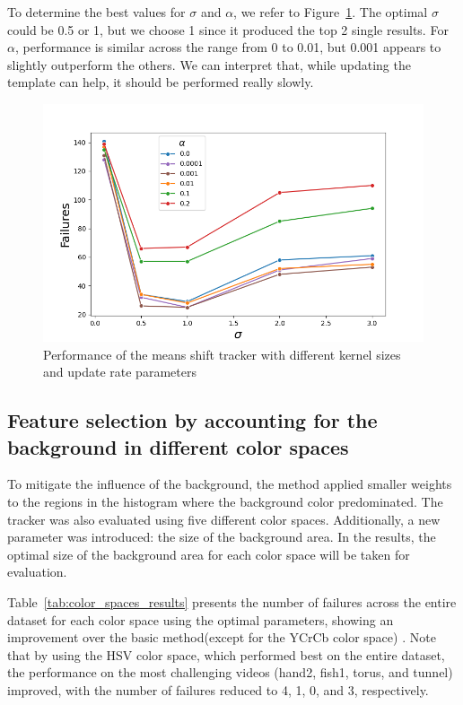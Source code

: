 \documentclass[9pt]{IEEEtran}
\begin{document}
To determine the best values for $\sigma$ and $\alpha$, we refer to Figure~\ref{fig:params2}. 
The optimal $\sigma$ could be 0.5 or 1, but we choose 1 since it produced the top 2 single
 results. For $\alpha$, performance is similar across the range from 0 to 0.01, but 0.001 appears
  to slightly outperform the others. We can interpret that, while updating the template can help, 
  it should be performed really slowly.
\begin{figure}[h]
  \centering
  \includegraphics[width=0.99\columnwidth]{figures/sigma_alpha.png}
  \caption{Performance of the means shift tracker with different kernel sizes and update rate
  parameters}
  \label{fig:params2}
\end{figure}

\subsection{Feature selection by accounting for the background in different color spaces}
To mitigate the influence of the background, the method applied smaller weights to the regions in the histogram where
 the background color predominated. The tracker was also evaluated using five different color spaces. Additionally,
  a new parameter was introduced: the size of the background area. In the results, the optimal size of the background area 
  for each color space will be taken for evaluation.

Table~\ref{tab:color_spaces_results} presents the number of failures across the entire dataset for each color 
space using the optimal parameters, showing an improvement over the basic 
method(except for the YCrCb color space) . Note that by using the HSV color 
space, which performed best on the entire dataset,
 the performance
 on the most challenging videos (hand2, fish1, torus, and tunnel) improved, with the number of failures
  reduced to 4, 1, 0, and 3, respectively. 
\end{document}
